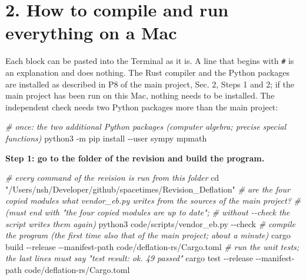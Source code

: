 \documentclass[
  10pt,
]{article}
\newenvironment{Shaded}{}{}
\newcommand{\AttributeTok}[1]{\textcolor[rgb]{0.49,0.56,0.16}{#1}}
\newcommand{\BuiltInTok}[1]{\textcolor[rgb]{0.00,0.50,0.00}{#1}}
\newcommand{\CommentTok}[1]{\textcolor[rgb]{0.38,0.63,0.69}{\textit{#1}}}
\newcommand{\ExtensionTok}[1]{#1}
\newcommand{\NormalTok}[1]{#1}
\newcommand{\StringTok}[1]{\textcolor[rgb]{0.25,0.44,0.63}{#1}}
\begin{document}
\hypertarget{how-to-compile-and-run-everything-on-a-mac}{%
\section{2. How to compile and run everything on a
Mac}\label{how-to-compile-and-run-everything-on-a-mac}}

Each block can be pasted into the Terminal as it is. A line that begins
with \texttt{\#} is an explanation and does nothing. The Rust compiler
and the Python packages are installed as described in P8 of the main
project, Sec. 2, Steps 1 and 2; if the main project has been run on this
Mac, nothing needs to be installed. The independent check needs two
Python packages more than the main project:

\begin{Shaded}
\begin{Highlighting}[]
\CommentTok{\# once: the two additional Python packages (computer algebra; precise special functions)}
\ExtensionTok{python3} \AttributeTok{{-}m}\NormalTok{ pip install }\AttributeTok{{-}{-}user}\NormalTok{ sympy mpmath}
\end{Highlighting}
\end{Shaded}

\textbf{Step 1: go to the folder of the revision and build the program.}

\begin{Shaded}
\begin{Highlighting}[]
\CommentTok{\# every command of the revision is run from this folder}
\BuiltInTok{cd} \StringTok{"/Users/nsh/Developer/github/spacetimes/Revision\_Deflation"}
\CommentTok{\# are the four copied modules what vendor\_eb.py writes from the sources of the main project?}
\CommentTok{\# (must end with "the four copied modules are up to date";}
\CommentTok{\#  without {-}{-}check the script writes them again)}
\ExtensionTok{python3}\NormalTok{ code/scripts/vendor\_eb.py }\AttributeTok{{-}{-}check}
\CommentTok{\# compile the program (the first time also that of the main project; about a minute)}
\ExtensionTok{cargo}\NormalTok{ build }\AttributeTok{{-}{-}release} \AttributeTok{{-}{-}manifest{-}path}\NormalTok{ code/deflation{-}rs/Cargo.toml}
\CommentTok{\# run the unit tests; the last lines must say "test result: ok. 49 passed"}
\ExtensionTok{cargo}\NormalTok{ test }\AttributeTok{{-}{-}release} \AttributeTok{{-}{-}manifest{-}path}\NormalTok{ code/deflation{-}rs/Cargo.toml}
\end{Highlighting}
\end{Shaded}
\end{document}
